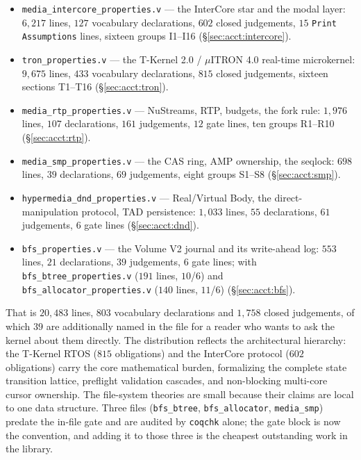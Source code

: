\documentclass[10pt,journal,compsoc,twocolumn]{article}
\theoremstyle{definition}
\theoremstyle{remark}
\theoremstyle{plain}
\newcommand{\ctr}[1]{\texttt{#1}}
\begin{document}
\begin{itemize}[leftmargin=*]
    \item \ctr{media\_intercore\_properties.v} --- the InterCore star and the
    modal layer: \(6{,}217\) lines, \(127\) vocabulary declarations, \(602\) closed
    judgements, \(15\) \ctr{Print Assumptions} lines, sixteen groups
    I1--I16 (\S\ref{sec:acct:intercore}).
    \item \ctr{tron\_properties.v} --- the T-Kernel 2.0 / $\mu$ITRON 4.0 real-time
    microkernel: \(9{,}675\) lines, \(433\) vocabulary declarations, \(815\) closed
    judgements, sixteen sections T1--T16 (\S\ref{sec:acct:tron}).
    \item \ctr{media\_rtp\_properties.v} --- NuStreams, RTP, budgets, the fork
    rule: \(1{,}976\) lines, \(107\) declarations, \(161\) judgements, \(12\) gate
    lines, ten groups R1--R10 (\S\ref{sec:acct:rtp}).
    \item \ctr{media\_smp\_properties.v} --- the CAS ring, AMP ownership, the
    seqlock: \(698\) lines, \(39\) declarations, \(69\) judgements, eight groups
    S1--S8 (\S\ref{sec:acct:smp}).
    \item \ctr{hypermedia\_dnd\_properties.v} --- Real/Virtual Body, the
    direct-manipulation protocol, TAD persistence: \(1{,}033\) lines, \(55\)
    declarations, \(61\) judgements, \(6\) gate lines (\S\ref{sec:acct:dnd}).
    \item \ctr{bfs\_properties.v} --- the Volume V2 journal and its write-ahead
    log: \(553\) lines, \(21\) declarations, \(39\) judgements, \(6\) gate lines;
    with \ctr{bfs\_btree\_properties.v} (\(191\) lines, \(10\)/\(6\)) and
    \ctr{bfs\_allocator\_properties.v} (\(140\) lines, \(11\)/\(6\))
    (\S\ref{sec:acct:bfs}).
\end{itemize}

\noindent
That is \(20{,}483\) lines, \(803\) vocabulary declarations and \(1{,}758\) closed
judgements, of which \(39\) are additionally named in the file for a reader who
wants to ask the kernel about them directly. The distribution reflects the architectural
hierarchy: the T-Kernel RTOS (\(815\) obligations) and the InterCore protocol (\(602\) obligations)
carry the core mathematical burden, formalizing the complete state transition lattice,
preflight validation cascades, and non-blocking multi-core cursor ownership. The file-system theories
are small because their claims are local to one data structure. Three files
(\ctr{bfs\_btree}, \ctr{bfs\_allocator}, \ctr{media\_smp}) predate the in-file
gate and are audited by \ctr{coqchk} alone; the gate block is now the convention,
and adding it to those three is the cheapest outstanding work in the library.
\end{document}
